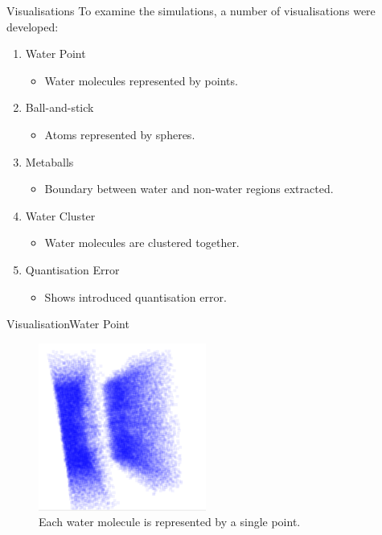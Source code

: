 \documentclass{beamer}
\begin{document}
\begin{frame}{Visualisations}
To examine the simulations, a number of visualisations were developed:
\begin{enumerate}

  \item Water Point
  \begin{itemize}
    \item Water molecules represented by points.
  \end{itemize}

  \item Ball-and-stick
  \begin{itemize}
    \item Atoms represented by spheres.
  \end{itemize}

  \item Metaballs
  \begin{itemize}
    \item Boundary between water and non-water regions extracted.
  \end{itemize}

  \item Water Cluster
  \begin{itemize}
    \item Water molecules are clustered together.
  \end{itemize}

  \item Quantisation Error
  \begin{itemize}
    \item Shows introduced quantisation error.
  \end{itemize}

\end{enumerate}
\end{frame}

\begin{frame}{Visualisation}{Water Point}
\begin{figure}
  \centering
  \includegraphics[width=55mm]{min-images/water-point.png}
  \caption{Each water molecule is represented by a single point.}
\end{figure}
\end{frame}
\end{document}
